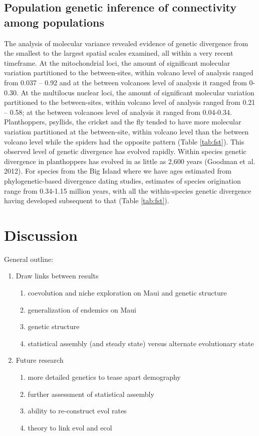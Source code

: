 \documentclass[12pt]{article}
\begin{document}
\subsection*{Population genetic inference of connectivity among
  populations}
The analysis of molecular variance revealed evidence of genetic
divergence from the smallest to the largest spatial scales examined,
all within a very recent timeframe. At the mitochondrial loci, the
amount of significant molecular variation partitioned to the
between-sites, within volcano level of analysis ranged from 0.037 –
0.92 and at the between volcanoes level of analysis it ranged from
0-0.30. At the multilocus nuclear loci, the amount of significant
molecular variation partitioned to the between-sites, within volcano
level of analysis ranged from 0.21 – 0.58; at the between volcanoes
level of analysis it ranged from 0.04-0.34. Planthoppers, psyllids,
the cricket and the fly tended to have more molecular variation
partitioned at the between-site, within volcano level than the between
volcano level while the spiders had the opposite pattern (Table
\ref{tab:fst}). This observed level of genetic divergence has evolved
rapidly. Within species genetic divergence in planthoppers has evolved
in as little as 2,600 years (Goodman et al. 2012). For species from
the Big Island where we have ages estimated from phylogenetic-based
divergence dating studies, estimates of species origination range from
0.34-1.15 million years, with all the within-species genetic
divergence having developed subsequent to that (Table \ref{tab:fst}).

\section*{Discussion}

General outline:
\begin{enumerate}
\item Draw links between results
  \begin{enumerate}
  \item coevolution and niche exploration on Maui and genetic structure
  \item generalization of endemics on Maui
  \item genetic structure
  \item statistical assembly (and steady state) versus alternate
    evolutionary state
  \end{enumerate}
% 
\item Future research
  \begin{enumerate}
  \item more detailed genetics to tease apart demography
  \item further assessment of statistical assembly
  \item ability to re-construct evol rates
  \item theory to link evol and ecol
  \end{enumerate}
\end{enumerate}
\end{document}
